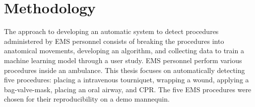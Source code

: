 
\chapter{Methodology}
\label{ch:Methodology}
The approach to developing an automatic system to detect procedures administered by EMS personnel consists of breaking the procedures into anatomical movements, developing an algorithm, and collecting data to train a machine learning model through a user study. EMS personnel perform various procedures inside an ambulance. This thesis focuses on automatically detecting five procedures: placing a intravenous tourniquet, wrapping a wound, applying a bag-valve-mask, placing an oral airway, and \gls{CPR}. The five EMS procedures were chosen for their reproducibility on a demo mannequin.

